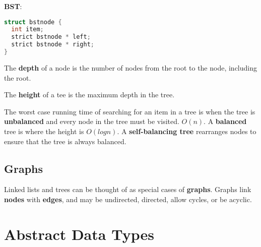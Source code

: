 \documentclass[english, 12pt]{article}
\begin{document}
\begin{defn}
\textbf{BST}:
\begin{lstlisting}[language=C]
struct bstnode {
  int item;
  strict bstnode * left;
  strict bstnode * right;
}
\end{lstlisting}
\end{defn}

\begin{defn}
The \textbf{depth} of a node is the number of nodes from the root to the node, including the root.
\end{defn}

\begin{defn}
The \textbf{height} of a tee is the maximum depth in the tree.
\end{defn}

\begin{note}
The worst case running time of searching for an item in a tree is when the tree is \textbf{unbalanced} and every node in the tree must be visited. $O(n)$. A \textbf{balanced} tree is where the height is $O(log n)$. A \textbf{self-balancing tree} rearranges nodes to ensure that the tree is always balanced.
\end{note}

\subsection{Graphs}
Linked lists and trees can be thought of as special cases of \textbf{graphs}. Graphs link \textbf{nodes} with \textbf{edges}, and may be undirected, directed, allow cycles, or be acyclic.

\section{Abstract Data Types}
\end{document}

